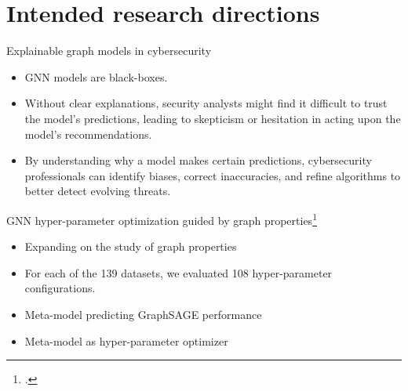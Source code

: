 \documentclass[10pt]{beamer}
\begin{document}
\section{Intended research directions}

\begin{frame}{Explainable graph models in cybersecurity}
	\begin{itemize}
		\item<1-> GNN models are black-boxes.
		\item<2-> Without clear explanations, security analysts might find it difficult to trust the model’s predictions, leading to skepticism or hesitation in acting upon the model’s recommendations.
		\item<3-> By understanding why a model makes certain predictions, cybersecurity professionals can identify biases, correct inaccuracies, and refine algorithms to better detect evolving threats.
	\end{itemize}

	\vspace{10pt}

\end{frame}

\begin{frame}{GNN hyper-parameter optimization guided by graph properties\footcite{prochazka_which_2023}}
	\begin{itemize}
		\item<1-> Expanding on the study of graph properties
		\item<1-> For each of the 139 datasets, we evaluated 108 hyper-parameter configurations.
		\item<2-> Meta-model predicting GraphSAGE performance
		\item<3-> Meta-model as hyper-parameter optimizer
	\end{itemize}

	\vfill

	\centering
\end{frame}
\end{document}
